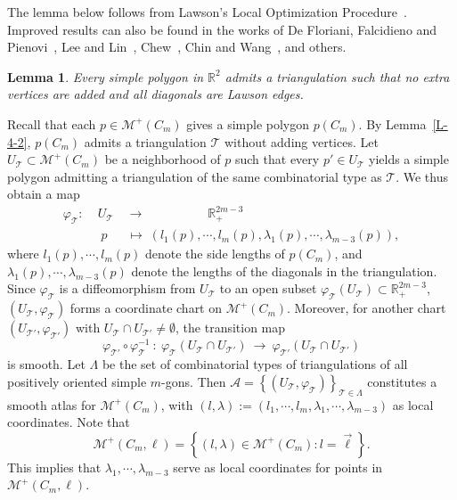 \documentclass[11pt,letterpaper]{amsart}
\theoremstyle{plain}
\newtheorem{lemma}[theorem]{Lemma}
\theoremstyle{definition}
\theoremstyle{remark}
\numberwithin{equation}{section}
\begin{document}
The lemma below follows from Lawson's Local Optimization Procedure~\cite{Lawson-1984}. Improved results can also be found in the works of De Floriani, Falcidieno and Pienovi~\cite{Floriani-1985}, Lee and Lin~\cite{Lee-1986}, Chew~\cite{Chew-1989}, Chin and Wang~\cite{Chin-1999}, and others.

\begin{lemma}\label{L-4-3}
Every simple polygon in $\mathbb R^2$ admits a triangulation such that no extra vertices are added and all diagonals are Lawson edges.
\end{lemma}

Recall that each $p\in \mathcal M^{+}(C_m)$ gives a simple polygon $p(C_m)$. By Lemma~\ref{L-4-2}, $p(C_m)$ admits a triangulation $\mathcal T$ without adding vertices. Let $U_{\mathcal T}\subset \mathcal M^{+}(C_m)$ be a neighborhood of $p$ such that every $p'\in U_{\mathcal T}$ yields a simple polygon admitting a triangulation of the same combinatorial type as $\mathcal T$. We thus obtain a map
\[
\begin{aligned}
\varphi_{\mathcal T}:\;&U_{\mathcal T}\quad \longrightarrow\qquad\qquad\quad \mathbb R_{+}^{2m-3}\\
&\;p\;\;\quad \longmapsto\;\left(l_1(p),\cdots,l_{m}(p),\lambda_{1}(p),\cdots,\lambda_{m-3}(p)\right),
\end{aligned}
\]
where $l_1(p),\cdots,l_{m}(p)$ denote the side lengths of $p(C_m)$, and $\lambda_{1}(p),\cdots,\lambda_{m-3}(p)$ denote the lengths of the diagonals in the triangulation. Since
$\varphi_{\mathcal T}$ is a diffeomorphism from $U_{\mathcal T}$ to an open subset $\varphi_{\mathcal T}(U_{\mathcal T}) \subset \mathbb R_{+}^{2m-3}$,
$(U_{\mathcal T}, \varphi_{\mathcal T})$ forms a coordinate chart on $\mathcal M^{+}(C_m)$.
Moreover, for another chart $(U_{\mathcal T'}, \varphi_{\mathcal T'})$ with
$U_{\mathcal T}\cap U_{\mathcal T'}\neq \emptyset$,  the transition map
\[
\varphi_{\mathcal T'} \circ\varphi^{-1}_{\mathcal T}~:~\varphi_{\mathcal T}\left(U_{\mathcal T}\cap U_{\mathcal T'}\right)
~\longrightarrow~\varphi_{\mathcal T'}\left(U_{\mathcal T}\cap U_{\mathcal T'}\right)
\]
is smooth. Let $\Lambda$ be the set of combinatorial types of triangulations of all positively oriented simple $m$-gons. Then
$\mathcal A=\left\{(U_{\mathcal T}, \varphi_{\mathcal T})\right\}_{\mathcal T\in \Lambda}$ constitutes a smooth atlas for $\mathcal M^{+}(C_m)$,
with $(l,\lambda):=(l_1,\cdots,l_{m}, \lambda_1,\cdots,\lambda_{m-3})$ as local coordinates. Note that
\[
\mathcal M^{+}(C_m,\ell)=\left\{(l,\lambda)\in\mathcal M^{+}(C_m):l=\vec{\ell}\right\}.
\]
This implies that $\lambda_{1},\cdots,\lambda_{m-3}$ serve as local coordinates for points in $\mathcal M^{+}(C_m,\ell)$.
\end{document}
